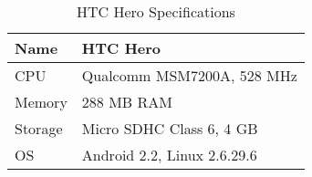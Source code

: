 \begin{table}
  \centering
  \caption{HTC Hero Specifications}
  \begin{tabular}{ | l | l |}
    \hline
    Name    & HTC Hero                          \\ \hline
    CPU     & Qualcomm MSM7200A, 528 MHz        \\ \hline
    Memory  & 288 MB \ac{RAM}                   \\ \hline
    Storage & Micro SDHC Class 6, 4 GB          \\ \hline
    \ac{OS} & Android 2.2, Linux 2.6.29.6      \\ \hline
  \end{tabular}
  \label{tbl:device:hero}
\end{table}
